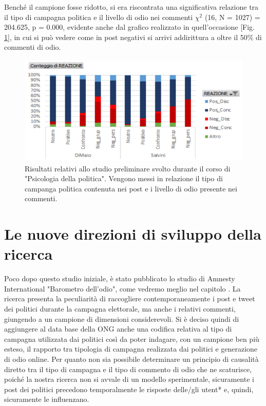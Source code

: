 Benché il campione fosse ridotto, si era riscontrata una significativa relazione tra il tipo di campagna politica e il livello di odio nei commenti $\chi^{2}$ (16, N = 1027) = 204.625, p = 0.000, evidente anche dal grafico realizzato in quell'occasione [Fig. \ref{fig:primotest}], in cui si può vedere come in post negativi si arrivi addirittura a oltre il 50\% di commenti di odio.
\begin{figure}
	\includegraphics[width=\textwidth]{figures/primotest}
	\caption{Risultati relativi allo studio preliminare svolto durante il corso di "Psicologia della politica". Vengono messi in relazione il tipo di campanga politica contenuta nei post e i livello di odio presente nei commenti.}
	\label{fig:primotest}
\end{figure}

\section{Le nuove direzioni di sviluppo della ricerca}
Poco dopo questo studio iniziale, è stato pubblicato lo studio di Amnesty International "Barometro dell'odio", come vedremo meglio nel capitolo . La ricerca presenta la peculiarità di raccogliere contemporaneamente i post e tweet dei politici durante la campagna elettorale, ma anche i relativi commenti, giungendo a un campione di dimensioni considerevoli. Si è deciso quindi di aggiungere al data base della ONG anche una codifica relativa al tipo di campagna utilizzata dai politici così da poter indagare, con un campione ben più esteso, il rapporto tra tipologia di campagna realizzata dai politici e generazione di odio online.
Per quanto non sia possibile determinare un principio di causalità diretto tra il tipo di campagna e il tipo di commento di odio che ne scaturisce, poiché la nostra ricerca non si avvale di un modello sperimentale, sicuramente i post dei politici precedono temporalmente le risposte delle/gli utent* e, quindi, sicuramente le influenzano.

